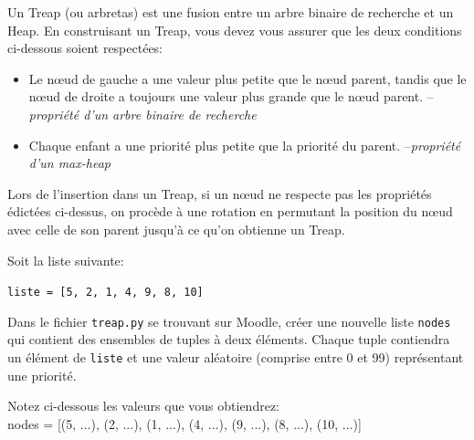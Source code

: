 \begin{Exercice}[30 minutes]
    Un Treap (ou arbretas) est une fusion entre un arbre binaire de recherche et un Heap. En construisant un Treap, vous devez vous assurer que les deux conditions ci-dessous soient respectées:

    \begin{itemize}
        \item Le nœud de gauche a une valeur plus petite que le nœud parent, tandis que le nœud de droite a toujours une valeur plus grande que le nœud parent. --\textit{propriété d'un arbre binaire de recherche}
        \item Chaque enfant a une priorité plus petite que la priorité du parent. --\textit{propriété d'un max-heap}
    \end{itemize}

    Lors de l'insertion dans un Treap, si un nœud ne respecte pas les propriétés édictées ci-dessus, on procède à une rotation en permutant la position du nœud avec celle de son parent jusqu'à ce qu'on obtienne un Treap.

 
    Soit la liste suivante:

    \lstinline{liste = [5, 2, 1, 4, 9, 8, 10]}

    Dans le fichier \lstinline{treap.py} se trouvant sur Moodle, créer une nouvelle liste \lstinline{nodes} qui contient des ensembles de tuples à deux éléments. Chaque tuple contiendra un élément de \lstinline{liste} et une valeur aléatoire (comprise entre 0 et 99) représentant une priorité.

    Notez ci-dessous les valeurs que vous obtiendrez:\\ 

    {\Large
    nodes = [(5, ...), (2, ...), (1, ...), (4, ...), (9, ...), (8, ...), (10, ...)]\\}

\end{Exercice}
